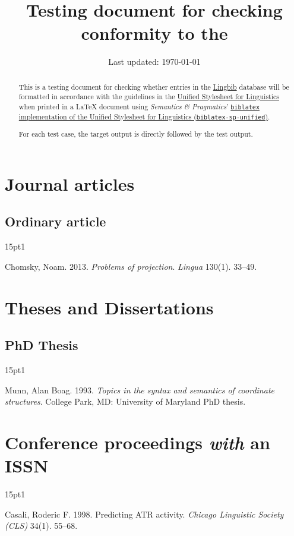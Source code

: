 \documentclass{article}
\title{Testing document for checking conformity to the \UnifiedStyleSheet}
\author{\Lingbib}
\date{Last updated: \today}
\newcommand*{\Lingbib}{\href{http://lingbib.org/}{Lingbib}}
\newcommand*{\SP}{\emph{Semantics \& Pragmatics}}
\newcommand*{\UnifiedStyleSheet}{\href{http://celxj.org/downloads/UnifiedStyleSheet.pdf}{Unified Stylesheet for Linguistics}}
\newcommand*{\Package}[1]{\texttt{#1}}
\newcommand*{\bibentrytest}[2]{
	\begin{hangparas}{15pt}{1}
	#1
	\end{hangparas}
	
	\nocite{#2}
	\printbibliography[heading=none]
}
\begin{document}
\maketitle

\begin{abstract}
This is a testing document for checking whether entries in the \Lingbib{} database will be formatted in accordance with the guidelines in the \UnifiedStyleSheet{} when printed in a \LaTeX{} document using  \SP' \href{https://github.com/semprag/biblatex-sp-unified/}{\Package{biblatex} implementation of the Unified Stylesheet for Linguistics (\Package{biblatex-sp-unified})}.

For each test case, the target output is directly followed by the test output.
\end{abstract}



\section{Journal articles}

\subsection{Ordinary article}

\bibentrytest{
	Chomsky, Noam. 2013. \textit{Problems of projection}. \textit{Lingua} 130(1). 33--49.
	}{
	chomsky2013:projection
}



\section{Theses and Dissertations}

\subsection{PhD Thesis}

\bibentrytest{
	Munn, Alan Boag. 1993. \textit{Topics in the syntax and semantics of coordinate structures}. College Park, MD: University of Maryland PhD thesis.
}{
munn1993:coordinate
}

\section{Conference proceedings \emph{with} an ISSN}

\bibentrytest{
	Casali, Roderic F. 1998. Predicting ATR activity. \textit{Chicago Linguistic Society (CLS)} 34(1). 55--68.
}{
	casali1998:ATR
}
\end{document}
